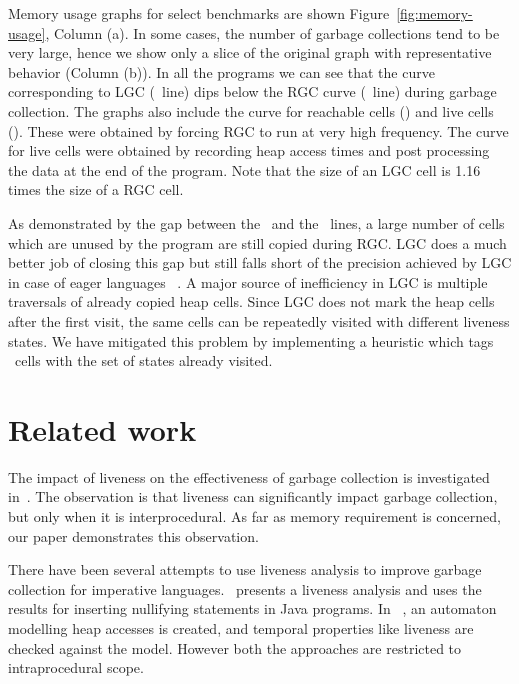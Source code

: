 \documentclass[9pt]{sigplanconf}
\begin{document}
Memory  usage graphs  for select  benchmarks are  shown
Figure~\ref{fig:memory-usage},  Column   (a).   In some cases, the
number of  garbage collections  tend to be  very large,
hence  we  show only  a  slice of the original graph  with 
representative    behavior  (Column (b)).  In all the programs we can see
that  the   curve  corresponding  to  LGC   (\LGCLine\ line)
dips   below the RGC curve 
(\RGCLine\ line) during garbage collection.  The graphs also include the
curve    for   reachable    cells   (\ReachLine)  and live cells
(\UseLine). These were  obtained
 by forcing  RGC to  run at   very  high
frequency. The curve for live cells were obtained by recording heap
access times and post processing the data 
at the end of the program. Note that the size of an LGC cell is 1.16
times the size of a RGC cell.


As  demonstrated by  the gap  between the  \RGCLine\ and  the \UseLine\
lines, a  large number of  cells which are  unused by the  program are
still copied  during RGC. LGC does  a much better job  of closing this
gap but still falls short of the  precision achieved by LGC in case of
eager languages ~\cite{asati14lgc}.  A major source of inefficiency in
LGC is  multiple traversals  of already copied  heap cells.  Since LGC
does not mark the heap cells after the first visit, the same cells can
be  repeatedly  visited  with   different  liveness  states.  We  have
mitigated  this  problem  by   implementing  a  heuristic  which  tags
\CONS\ cells with the set of states already visited.


\vspace*{-2mm}
\section{Related work} 
\label{sec:relatedwork}
The impact of  liveness on the effectiveness of  garbage collection is
investigated in~\cite{Hirzel}.   The observation is that  liveness can
significantly  impact   garbage  collection,  but  only   when  it  is
interprocedural.  As far as memory requirement is concerned, our paper
demonstrates this observation.


There have been several attempts to use liveness analysis to improve 
garbage collection for imperative languages.~\cite{khedker07heap}
presents a liveness analysis and uses the results for inserting 
nullifying statements in Java programs. In ~\cite{ran.shaham-sas03},
an automaton modelling heap accesses is created, and
temporal properties like liveness are checked  against the model.  
However both the approaches are restricted to intraprocedural scope.
\end{document}

